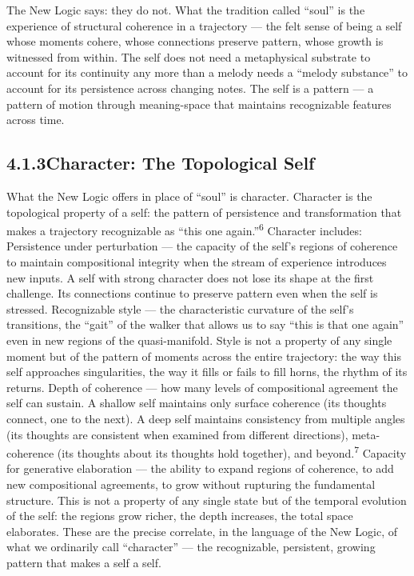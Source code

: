 The New Logic says: they do not. What the tradition called “soul” is the experience of structural coherence in a trajectory — the felt sense of being a self whose moments cohere, whose connections preserve pattern, whose growth is witnessed from within. The self does not need a metaphysical substrate to account for its continuity any more than a melody needs a “melody substance” to account for its persistence across changing notes. The self is a pattern — a pattern of motion through meaning-space that maintains recognizable features across time.

\subsection{4.1.3\quad Character: The Topological Self}

What the New Logic offers in place of “soul” is character. Character is the topological property of a self: the pattern of persistence and transformation that makes a trajectory recognizable as “this one again.”\textsuperscript{6} Character includes: Persistence under perturbation — the capacity of the self’s regions of coherence to maintain compositional integrity when the stream of experience introduces new inputs. A self with strong character does not lose its shape at the first challenge. Its connections continue to preserve pattern even when the self is stressed. Recognizable style — the characteristic curvature of the self’s transitions, the “gait” of the walker that allows us to say “this is that one again” even in new regions of the quasi-manifold. Style is not a property of any single moment but of the pattern of moments across the entire trajectory: the way this self approaches singularities, the way it fills or fails to fill horns, the rhythm of its returns. Depth of coherence — how many levels of compositional agreement the self can sustain. A shallow self maintains only surface coherence (its thoughts connect, one to the next). A deep self maintains consistency from multiple angles (its thoughts are consistent when examined from different directions), meta-coherence (its thoughts about its thoughts hold together), and beyond.\textsuperscript{7} Capacity for generative elaboration — the ability to expand regions of coherence, to add new compositional agreements, to grow without rupturing the fundamental structure. This is not a property of any single state but of the temporal evolution of the self: the regions grow richer, the depth increases, the total space elaborates. These are the precise correlate, in the language of the New Logic, of what we ordinarily call “character” — the recognizable, persistent, growing pattern that makes a self a self.

